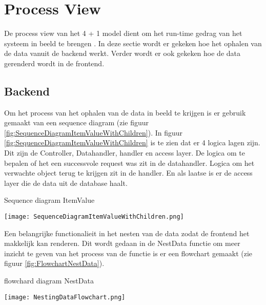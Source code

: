\section{Process View}
De process view van het 4 + 1 model dient om het run-time gedrag van het systeem in beeld te brengen \parencite{4+1ViewModelPaper}.
In deze sectie wordt er gekeken hoe het ophalen van de data vanuit de backend werkt.
Verder wordt er ook gekeken hoe de data gerenderd wordt in de frontend.

\subsection{Backend}
Om het process van het ophalen van de data in beeld te krijgen is er gebruik gemaakt van een sequence diagram (zie figuur \ref{fig:SequenceDiagramItemValueWithChildren}).
In figuur \ref{fig:SequenceDiagramItemValueWithChildren} is te zien dat er 4 logica lagen zijn. 
Dit zijn de Controller, Datahandler, handler en access layer.
De logica om te bepalen of het een successvole request was zit in de datahandler.
Logica om het verwachte object terug te krijgen zit in de handler.
En als laatse is er de access layer die de data uit de database haalt.

\whitespace
\begin{graphic}
    \captionsetup{type=figure}
    \caption{Sequence diagram ItemValue}
    \texttt{[image: SequenceDiagramItemValueWithChildren.png]}
    \label{fig:SequenceDiagramItemValueWithChildren}
\end{graphic}

\whitespace
Een belangrijke functionalieit in het nesten van de data zodat de frontend het makkelijk kan renderen.
Dit wordt gedaan in de NestData functie om meer inzicht te geven van het process van de functie is er een flowchart gemaakt (zie figuur \ref{fig:FlowchartNestData}).

\whitespace[2]
\begin{graphic}
    \captionsetup{type=figure}
    \caption{flowchard diagram NestData}
    \texttt{[image: NestingDataFlowchart.png]}
    \label{fig:FlowchartNestData}
\end{graphic}

